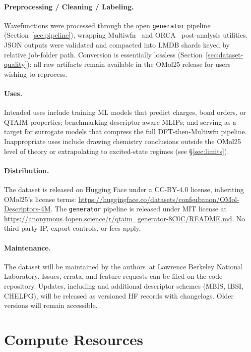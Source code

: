 \paragraph{Preprocessing / Cleaning / Labeling.}
Wavefunctions were processed through the open \texttt{generator} pipeline
(Section~\ref{sec:pipeline}), wrapping Multiwfn~\citep{multiwfn} and
ORCA~\citep{orca5} post-analysis utilities. JSON outputs were validated and
compacted into LMDB shards keyed by relative job-folder path. Conversion is
essentially lossless (Section~\ref{sec:dataset-quality}); all raw artifacts
remain available in the OMol25 release for users wishing to reprocess.

\paragraph{Uses.}
Intended uses include training ML models that predict charges, bond orders,
or QTAIM properties; benchmarking descriptor-aware MLIPs; and serving as a
target for surrogate models that compress the full DFT-then-Multiwfn pipeline.
Inappropriate uses include drawing chemistry conclusions outside the OMol25
level of theory or extrapolating to excited-state regimes (see \S\ref{sec:limits}).

\paragraph{Distribution.}
The dataset is released on Hugging Face under a CC-BY-4.0 license, inheriting
OMol25's license terms: \url{https://huggingface.co/datasets/confsubanon/OMol-Descriptors-4M}.
The \texttt{generator} pipeline is released under MIT license at
\url{https://anonymous.4open.science/r/qtaim_generator-8C0C/README.md}. No third-party IP, export controls, or fees
apply.

\paragraph{Maintenance.}
The dataset will be maintained by the authors\ifanon\else\ at Lawrence Berkeley National
Laboratory\fi. Issues, errata, and feature requests can be filed on the code
repository. Updates, including  and additional descriptor schemes (MBIS, IBSI, CHELPG), will be
released as versioned HF records with changelogs. Older versions will
remain accessible.

\section{Compute Resources}
\label{app:compute}

